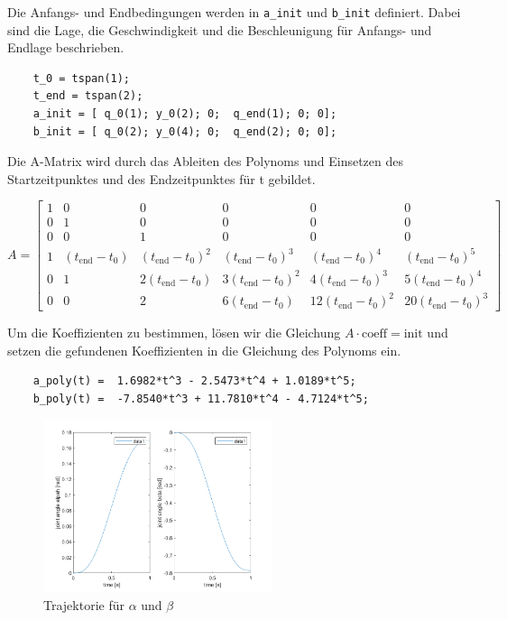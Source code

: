 Die Anfangs- und Endbedingungen werden in \texttt{a\_init} und \texttt{b\_init} definiert. Dabei sind die Lage, die Geschwindigkeit und die Beschleunigung für Anfangs- und Endlage beschrieben.

\begin{verbatim}
    t_0 = tspan(1);
    t_end = tspan(2);
    a_init = [ q_0(1); y_0(2); 0;  q_end(1); 0; 0];
    b_init = [ q_0(2); y_0(4); 0;  q_end(2); 0; 0];
\end{verbatim}


Die A-Matrix wird durch das Ableiten des Polynoms und Einsetzen des Startzeitpunktes und des Endzeitpunktes für t gebildet. 

\begin{equation*}
	A = \begin{bmatrix}
        1 & 0 & 0 & 0 & 0 & 0 \\
        0 & 1 & 0 & 0 & 0 & 0 \\
        0 & 0 & 1 & 0 & 0 & 0 \\
        1 & (t_{\text{end}} - t_0) & (t_{\text{end}} - t_0)^2 & (t_{\text{end}} - t_0)^3 & (t_{\text{end}} - t_0)^4 & (t_{\text{end}} - t_0)^5 \\
        0 & 1 & 2(t_{\text{end}} - t_0) & 3(t_{\text{end}} - t_0)^2 & 4(t_{\text{end}} - t_0)^3 & 5(t_{\text{end}} - t_0)^4 \\
        0 & 0 & 2 & 6(t_{\text{end}} - t_0) & 12(t_{\text{end}} - t_0)^2 & 20(t_{\text{end}} - t_0)^3
    \end{bmatrix}
\end{equation*}

Um die Koeffizienten zu bestimmen, lösen wir die Gleichung \(A \cdot \text{coeff} = \text{init}\) und setzen die gefundenen Koeffizienten in die Gleichung des Polynoms ein.

\begin{verbatim}
    a_poly(t) =  1.6982*t^3 - 2.5473*t^4 + 1.0189*t^5;
    b_poly(t) =  -7.8540*t^3 + 11.7810*t^4 - 4.7124*t^5;
\end{verbatim}


\begin{figure}[H]
	\centering
	\includegraphics[width=0.6\textwidth]{Trajektorie.png}
	\caption{Trajektorie für \(\alpha\) und \(\beta\) }
\end{figure}

